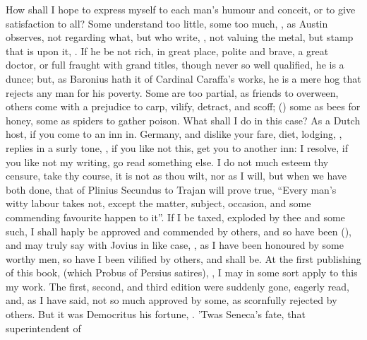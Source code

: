 How shall I hope to express myself to each man's humour and
conceit, or to give satisfaction to all? Some understand
too little, some too much, , as Austin observes, not regarding what, but who
write, , not valuing
the metal, but stamp that is upon it, .
If he be not rich, in great place, polite and brave, a great doctor, or full
fraught with grand titles, though never so well qualified, he is a dunce; but,
as Baronius hath it of Cardinal Caraffa's works, he is a
mere hog that rejects any man for his poverty. Some are too partial, as friends
to overween, others come with a prejudice to carp, vilify, detract, and scoff;
() some
as bees for honey, some as spiders to gather poison. What shall I do in this
case? As a Dutch host, if you come to an inn in. Germany, and dislike your
fare, diet, lodging, \etc{}, replies in a surly tone,
, if you like not
this, get you to another inn: I resolve, if you like not my writing, go read
something else. I do not much esteem thy censure, take thy course, it is not as
thou wilt, nor as I will, but when we have both done, that of
Plinius Secundus to Trajan will prove true, \enquote{Every man's
witty labour takes not, except the matter, subject, occasion, and some
commending favourite happen to it}. If I be taxed, exploded by thee and some
such, I shall haply be approved and commended by others, and so have been
(), and may truly say with Jovius in
like case, , as I have
been honoured by some worthy men, so have I been vilified by others, and shall
be. At the first publishing of this book, (which Probus
of Persius satires), , I may in some sort apply to this my work. The first,
second, and third edition were suddenly gone, eagerly read, and, as I have
said, not so much approved by some, as scornfully rejected by others. But it
was Democritus his fortune, . 'Twas Seneca's fate, that superintendent of
